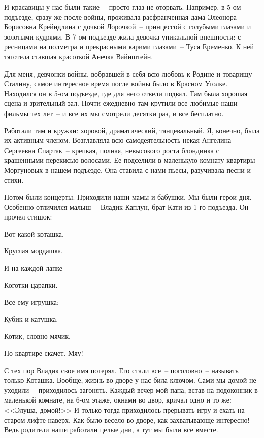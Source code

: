 И красавицы у нас были такие~-- просто глаз не оторвать. Например, в 5-ом подъезде, сразу же после войны, проживала расфранченная дама Элеонора Борисовна Крейндлина с дочкой Лорочкой~-- принцессой с голубыми глазами и золотыми кудрями. В 7-ом подъезде жила девочка уникальной внешности: с ресницами на полметра и прекрасными карими глазами~-- Туся Еременко. К ней тяготела ставшая красоткой Анечка Вайнштейн.

Для меня, девчонки войны, вобравшей в себя всю любовь к Родине и товарищу Сталину, самое интересное время после войны было в Красном Уголке. Находился он в 5-ом подъезде, где для него отвели подвал. Там была хорошая сцена и зрительный зал. Почти ежедневно там крутили все любимые наши фильмы тех лет~-- и все их мы смотрели десятки раз, и все бесплатно.

Работали там и кружки: хоровой, драматический, танцевальный. Я, конечно, была их активным членом. Возглавляла всю самодеятельность некая Ангелина Сергеевна Спартак~-- крепкая, полная, невысокого роста блондинка с крашенными перекисью волосами. Ее подселили в маленькую комнату квартиры Моргуновых в нашем подъезде. Она ставила с нами пьесы, разучивала песни и стихи.

Потом были концерты. Приходили наши мамы и бабушки. Мы были герои дня. Особенно отличился малыш~-- Владик Каплун, брат Кати из 1-го подъезда. Он прочел стишок:

\nepage

{\itshape

    Вот какой коташка,
    
    Круглая мордашка.
    
    И на каждой лапке
    
    Коготки-царапки.
    
    Все ему игрушка:
    
    Кубик и катушка.
    
    Котик, словно мячик,
    
    По квартире скачет. Мяу!
    
}

\indent

С тех пор Владик свое имя потерял. Его стали все~-- поголовно~-- называть только Коташка. Вообще, жизнь во дворе у нас била ключом. Сами мы домой не уходили~-- приходилось загонять. Каждый вечер мой папа, встав на подоконник в маленькой комнате, на 6-ом этаже, окнами во двор, кричал одно и то же: <<Элуша, домой!>> И только тогда приходилось прерывать игру и ехать на старом лифте наверх. Как было весело во дворе, как захватывающе интересно! Ведь родители наши работали целые дни, а тут мы были все вместе.

